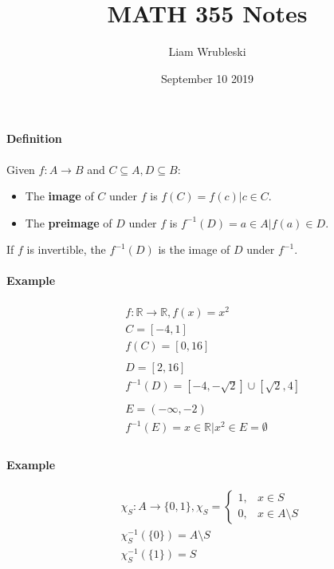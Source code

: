 \documentclass{article}
\title{MATH 355 Notes}
\author{Liam Wrubleski}
\date{September 10 2019}
\newcommand{\mapab}[2]{{#1}\xrightarrow{}{#2}}
\newcommand{\mapAB}[2]{\mathbb{#1}\xrightarrow{}\mathbb{#2}}
\begin{document}
	\maketitle
	\paragraph{Definition}
	Given $f:\mapab{A}{B}$ and $C\subseteq A, D\subseteq B:$
	\begin{itemize}
		\item The \textbf{image} of $C$ under $f$ is $f(C) = {f(c)|c\in C}$.\\
		\item The \textbf{preimage} of $D$ under $f$ is $f^{-1}(D) = {a\in A|f(a)\in D}$.\\
	\end{itemize}
	If $f$ is invertible, the $f^{-1}(D)$ is the image of $D$ under $f^{-1}$.
	\paragraph{Example}
	\begin{align*}
	&f:\mapAB{R}{R}, f(x) = x^2\\
	&C = [-4, 1]\\
	&f(C) = [0,16]\\~\\
	&D = [2,16]\\
	&f^{-1}(D) = [-4,-\sqrt{2}]\cup[\sqrt{2},4]\\~\\
	&E=(-\infty,-2)\\
	&f^{-1}(E) = {x\in\mathbb{R}|x^2\in E} = \emptyset\\
	\end{align*}
	\paragraph{Example}
	\begin{align*}
	&\chi_S:\mapab{A}{\{0,1\}}, \chi_S=\begin{cases}1, & x\in S\\0, & x\in A\setminus S
	\end{cases}\\
	&\chi_S^{-1}(\{0\}) = A\setminus S\\
	&\chi_S^{-1}(\{1\}) = S
	\end{align*}
\end{document}
